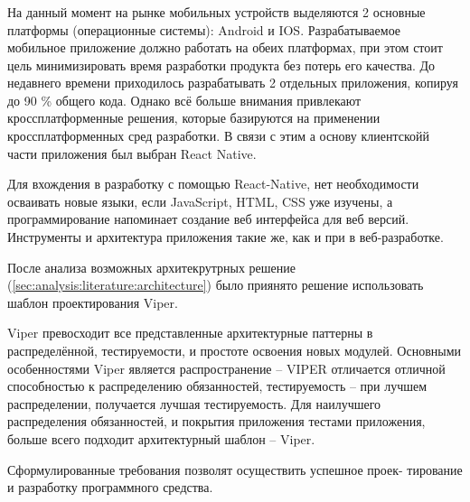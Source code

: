 \subsubsection{}
\label{sec:analysis:specification:language}

На данный момент на рынке мобильных устройств выделяются 2 основные платформы (операционные системы): Android и IOS. Разрабатываемое мобильное приложение должно работать на обеих платформах, при этом стоит цель минимизировать время разработки продукта без потерь его качества. До недавнего времени приходилось разрабатывать 2 отдельных приложения, копируя до 90 \% общего кода. Однако всё больше внимания привлекают кроссплатформенные решения, которые базируются на применении кроссплатформенных сред разработки. В связи с этим а основу клиентскойй части приложения был выбран React Native.

Для вхождения в разработку с помощью React-Native, нет необходимости осваивать новые языки, если JavaScript, HTML, CSS уже изучены, а программирование напоминает
создание веб интерфейса для веб версий. Инструменты и архитектура приложения такие же, как и при в веб-разработке. 

После анализа возможных архитекрутрных решение (\ref{sec:analysis:literature:architecture}) было приянято решение использовать шаблон проектирования Viper.

Viper превосходит все представленные архитектурные паттерны в
распределённой, тестируемости, и простоте освоения новых модулей.
Основными особенностями Viper является распространение – VIPER
отличается отличной способностью к распределению обязанностей,
тестируемость – при лучшем распределении, получается лучшая тестируемость.
Для наилучшего распределения обязанностей,
и покрытия приложения тестами приложения, больше всего подходит
архитектурный шаблон -- Viper. 

Сформулированные требования позволят осуществить успешное проек- тирование и разработку программного средства.

